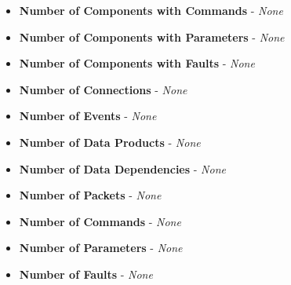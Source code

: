 \begin{itemize}
  \item \textbf{Number of Components with Commands} - 
    \textit{None}

  \item \textbf{Number of Components with Parameters} - 
    \textit{None}

  \item \textbf{Number of Components with Faults} - 
    \textit{None}

  \item \textbf{Number of Connections} - 
    \textit{None}

  \item \textbf{Number of Events} - 
    \textit{None}

  \item \textbf{Number of Data Products} - 
    \textit{None}

  \item \textbf{Number of Data Dependencies} - 
    \textit{None}

  \item \textbf{Number of Packets} - 
    \textit{None}
    
  \item \textbf{Number of Commands} - 
    \textit{None}

  \item \textbf{Number of Parameters} - 
    \textit{None}

  \item \textbf{Number of Faults} - 
    \textit{None}

\end{itemize}
